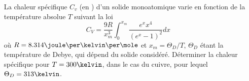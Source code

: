 \begin{exercice}\label{exoSC_serie4-0001}

	La chaleur spécifique $C_v$ (en \joule\per\kelvin\per\mole) d'un solide monoatomique varie en fonction de la température absolue $T$ suivant la loi
	\begin{equation}
		C_V=\frac{ 9R }{ x_m^3 }\int_0^{x_m}\frac{  e^{x}x^4 }{ (e^x-1)^2 }dx
	\end{equation}
	où $R=8.314\joule\per\kelvin\per\mole$ et $x_m=\Theta_D/T$, $\Theta_D$ étant la température de Debye, qui dépend du solide considéré. Déterminer la chaleur spécifique pour $T=300\kelvin$, dans le cas du cuivre, pour lequel $\Theta_D=313\kelvin$.

\end{exercice}
